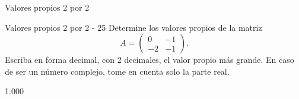\documentclass[a4,11pt]{aleph-notas}
\begin{document}
\begin{quiz}{Valores propios 2 por 2}
\begin{numerical}[tolerance=0.01]%
    {Valores propios 2 por 2 - 25}
    Determine los valores propios de la matriz
    \[
    A = \begin{pmatrix}
    0 & -1 \\
    -2 & -1
    \end{pmatrix}.
    \]
    Escriba en forma decimal, con 2 decimales, el valor propio más grande. En caso de ser un número complejo, tome en cuenta solo la parte real.
    \item[] 1.000
\end{numerical}




\end{quiz}
\end{document}
